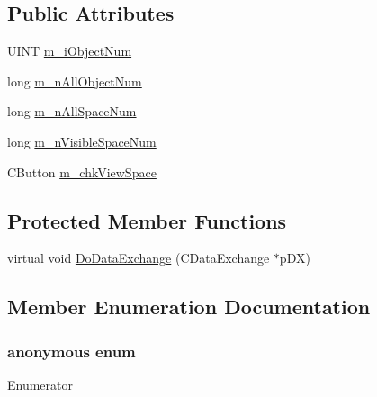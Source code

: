 \subsection*{Public Attributes}
\begin{DoxyCompactItemize}
\item 
U\+I\+N\+T \hyperlink{class_c_dlg_space_view_a89d79f60435c582defd0497c908babff}{m\+\_\+i\+Object\+Num}
\item 
long \hyperlink{class_c_dlg_space_view_af18ff2bdc0c7bbe704fc97e1e3e3015a}{m\+\_\+n\+All\+Object\+Num}
\item 
long \hyperlink{class_c_dlg_space_view_a77954c457d8e5f042752c306746b0d88}{m\+\_\+n\+All\+Space\+Num}
\item 
long \hyperlink{class_c_dlg_space_view_af16ef4e04f01d082467b9afc0fb36aef}{m\+\_\+n\+Visible\+Space\+Num}
\item 
C\+Button \hyperlink{class_c_dlg_space_view_ac6ba957f78c3e1ab0913546eb27ef014}{m\+\_\+chk\+View\+Space}
\end{DoxyCompactItemize}
\subsection*{Protected Member Functions}
\begin{DoxyCompactItemize}
\item 
virtual void \hyperlink{class_c_dlg_space_view_a4851536585270ce4946e3beddcd50e03}{Do\+Data\+Exchange} (C\+Data\+Exchange $\ast$p\+D\+X)
\end{DoxyCompactItemize}


\subsection{Member Enumeration Documentation}
\hypertarget{class_c_dlg_space_view_aa1d599418cc773fe475c1265a6a19274}{}\subsubsection[{anonymous enum}]{\setlength{\rightskip}{0pt plus 5cm}anonymous enum}\label{class_c_dlg_space_view_aa1d599418cc773fe475c1265a6a19274}
\begin{Desc}
\item[Enumerator]\par
\begin{description}
\item[{\em 
\hypertarget{class_c_dlg_space_view_aa1d599418cc773fe475c1265a6a19274a883ade28e126068686c7a9417977b146}{}I\+D\+D\label{class_c_dlg_space_view_aa1d599418cc773fe475c1265a6a19274a883ade28e126068686c7a9417977b146}
}]\end{description}
\end{Desc}


